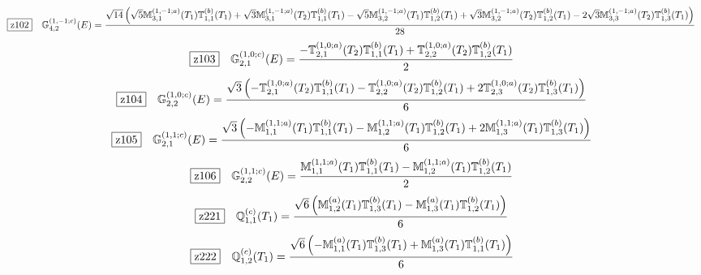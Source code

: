 \documentclass[fleqn,10pt,landscape]{jsarticle}
\begin{document}
\begin{dmath*}
\hspace*{3mm}\fbox{z102}\quad \mathbb{G}_{4,2}^{(1,-1;c)}(E)=\frac{\sqrt{14} \left(\sqrt{5} \mathbb{M}_{3,1}^{(1,-1;a)}(T_{1}) \mathbb{T}_{1,1}^{(b)}(T_{1}) + \sqrt{3} \mathbb{M}_{3,1}^{(1,-1;a)}(T_{2}) \mathbb{T}_{1,1}^{(b)}(T_{1}) - \sqrt{5} \mathbb{M}_{3,2}^{(1,-1;a)}(T_{1}) \mathbb{T}_{1,2}^{(b)}(T_{1}) + \sqrt{3} \mathbb{M}_{3,2}^{(1,-1;a)}(T_{2}) \mathbb{T}_{1,2}^{(b)}(T_{1}) - 2 \sqrt{3} \mathbb{M}_{3,3}^{(1,-1;a)}(T_{2}) \mathbb{T}_{1,3}^{(b)}(T_{1})\right)}{28}
\end{dmath*}
\begin{dmath*}
\hspace*{3mm}\fbox{z103}\quad \mathbb{G}_{2,1}^{(1,0;c)}(E)=\frac{- \mathbb{T}_{2,1}^{(1,0;a)}(T_{2}) \mathbb{T}_{1,1}^{(b)}(T_{1}) + \mathbb{T}_{2,2}^{(1,0;a)}(T_{2}) \mathbb{T}_{1,2}^{(b)}(T_{1})}{2}
\end{dmath*}
\begin{dmath*}
\hspace*{3mm}\fbox{z104}\quad \mathbb{G}_{2,2}^{(1,0;c)}(E)=\frac{\sqrt{3} \left(- \mathbb{T}_{2,1}^{(1,0;a)}(T_{2}) \mathbb{T}_{1,1}^{(b)}(T_{1}) - \mathbb{T}_{2,2}^{(1,0;a)}(T_{2}) \mathbb{T}_{1,2}^{(b)}(T_{1}) + 2 \mathbb{T}_{2,3}^{(1,0;a)}(T_{2}) \mathbb{T}_{1,3}^{(b)}(T_{1})\right)}{6}
\end{dmath*}
\begin{dmath*}
\hspace*{3mm}\fbox{z105}\quad \mathbb{G}_{2,1}^{(1,1;c)}(E)=\frac{\sqrt{3} \left(- \mathbb{M}_{1,1}^{(1,1;a)}(T_{1}) \mathbb{T}_{1,1}^{(b)}(T_{1}) - \mathbb{M}_{1,2}^{(1,1;a)}(T_{1}) \mathbb{T}_{1,2}^{(b)}(T_{1}) + 2 \mathbb{M}_{1,3}^{(1,1;a)}(T_{1}) \mathbb{T}_{1,3}^{(b)}(T_{1})\right)}{6}
\end{dmath*}
\begin{dmath*}
\hspace*{3mm}\fbox{z106}\quad \mathbb{G}_{2,2}^{(1,1;c)}(E)=\frac{\mathbb{M}_{1,1}^{(1,1;a)}(T_{1}) \mathbb{T}_{1,1}^{(b)}(T_{1}) - \mathbb{M}_{1,2}^{(1,1;a)}(T_{1}) \mathbb{T}_{1,2}^{(b)}(T_{1})}{2}
\end{dmath*}
\begin{dmath*}
\hspace*{3mm}\fbox{z221}\quad \mathbb{Q}_{1,1}^{(c)}(T_{1})=\frac{\sqrt{6} \left(\mathbb{M}_{1,2}^{(a)}(T_{1}) \mathbb{T}_{1,3}^{(b)}(T_{1}) - \mathbb{M}_{1,3}^{(a)}(T_{1}) \mathbb{T}_{1,2}^{(b)}(T_{1})\right)}{6}
\end{dmath*}
\begin{dmath*}
\hspace*{3mm}\fbox{z222}\quad \mathbb{Q}_{1,2}^{(c)}(T_{1})=\frac{\sqrt{6} \left(- \mathbb{M}_{1,1}^{(a)}(T_{1}) \mathbb{T}_{1,3}^{(b)}(T_{1}) + \mathbb{M}_{1,3}^{(a)}(T_{1}) \mathbb{T}_{1,1}^{(b)}(T_{1})\right)}{6}
\end{dmath*}
\end{document}
